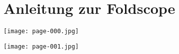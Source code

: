 \section{Anleitung zur Foldscope}
    \label{appdx:anleitung}
    \begin{center}
        \vfill
        \texttt{[image: page-000.jpg]}
        \vfill
    \end{center}
    \begin{center}
        \texttt{[image: page-001.jpg]}
    \end{center}